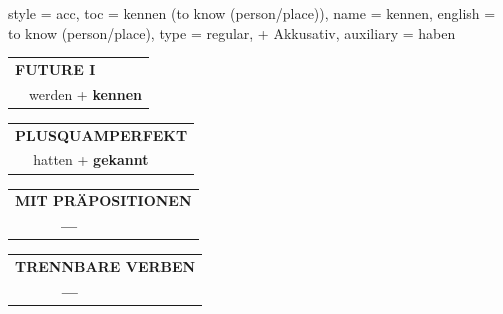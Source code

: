 \begin{verbentry}{
  style = {acc},
  toc = {kennen (to know (person/place))},
  name = {kennen},
  english = {to know (person/place)},
  type = {regular, + Akkusativ},
  auxiliary = {haben}
}
\begin{tabular}{rl}
    \multicolumn{2}{l}{\textbf{FUTURE I} }\\
  &  werden + \textbf{kennen}\\
 
  \end{tabular}
\hfill
   \begin{tabular}{rl}
      \multicolumn{2}{l}{\textbf{PLUSQUAMPERFEKT}}\\
   & hatten + \textbf{gekannt}\\
  \end{tabular}
  
  
\vspace{10pt}

\begin{tabular}{lll}
\multicolumn{3}{l}{\textbf{MIT PRÄPOSITIONEN}}\\
& \textbf{---} & \\
\end{tabular}
\hfill
\begin{tabular}{lll}
\multicolumn{3}{l}{\textbf{TRENNBARE VERBEN}}\\
& \textbf{---} & \\
\end{tabular}
\vspace{-5pt}
\end{verbentry}


